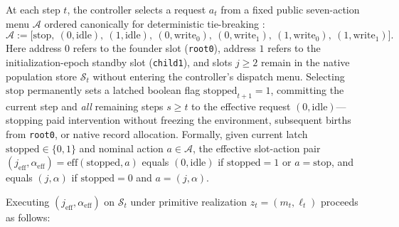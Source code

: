 \documentclass[11pt,letterpaper]{article}
\begin{document}
At each step \(t\), the controller selects a request \(a_t\) from a
fixed public seven-action menu \(\mathcal{A}\) ordered canonically for
deterministic tie-breaking \citep{derman1970, puterman1994}:
\[\mathcal{A} := \bigl[\mathrm{stop},\ (0, \mathrm{idle}),\ (1, \mathrm{idle}),\ (0, \mathrm{write}_0),\ (0, \mathrm{write}_1),\ (1, \mathrm{write}_0),\ (1, \mathrm{write}_1)\bigr].\]
Here address \(0\) refers to the founder slot (\texttt{root0}), address
\(1\) refers to the initialization-epoch standby slot (\texttt{child1}),
and slots \(j \ge 2\) remain in the native population store
\(\mathcal{S}_t\) without entering the controller's dispatch menu.
Selecting \(\mathrm{stop}\) permanently sets a latched boolean flag
\(\mathrm{stopped}_{t+1} = 1\), committing the current step and
\emph{all} remaining steps \(s \ge t\) to the effective request
\((0, \mathrm{idle})\)---stopping paid intervention without freezing the
environment, subsequent births from \texttt{root0}, or native record
allocation. Formally, given current latch
\(\mathrm{stopped} \in \{0,1\}\) and nominal action
\(a \in \mathcal{A}\), the effective slot-action pair
\((j_{\mathrm{eff}}, \alpha_{\mathrm{eff}}) = \mathrm{eff}(\mathrm{stopped}, a)\)
equals \((0, \mathrm{idle})\) if \(\mathrm{stopped} = 1\) or
\(a = \mathrm{stop}\), and equals \((j, \alpha)\) if
\(\mathrm{stopped} = 0\) and \(a = (j, \alpha)\).

Executing \((j_{\mathrm{eff}}, \alpha_{\mathrm{eff}})\) on
\(\mathcal{S}_t\) under primitive realization \(z_t = (m_t, \ell_t)\)
proceeds as follows:
\end{document}

